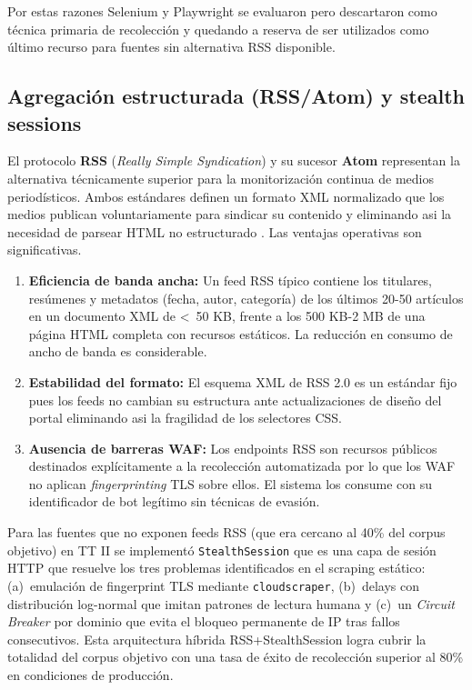 Por estas razones Selenium y Playwright se evaluaron pero descartaron como
técnica primaria de recolección y quedando a reserva de ser utilizados
como último recurso para fuentes sin alternativa RSS disponible.

\subsection{Agregación estructurada (RSS/Atom) y stealth sessions}
\label{subsec:ea_rss_stealth}

El protocolo \textbf{RSS} (\textit{Really Simple Syndication}) y su sucesor
\textbf{Atom} representan la alternativa técnicamente superior para la
monitorización continua de medios periodísticos. Ambos estándares definen
un formato XML normalizado que los medios publican voluntariamente para sindicar
su contenido y eliminando asi la necesidad de parsear HTML no estructurado
\cite{hammersley2005developing}. Las ventajas operativas son significativas.

\begin{enumerate}
    \item \textbf{Eficiencia de banda ancha:} Un feed RSS típico contiene los
          titulares, resúmenes y metadatos (fecha, autor, categoría) de los
          últimos 20-50 artículos en un documento XML de \textless~50 KB,
          frente a los 500 KB-2 MB de una página HTML completa con recursos
          estáticos. La reducción en consumo de ancho de banda es considerable.

    \item \textbf{Estabilidad del formato:} El esquema XML de RSS 2.0 es un
          estándar fijo pues los feeds no cambian su estructura ante
          actualizaciones de diseño del portal eliminando asi la fragilidad de
          los selectores CSS.

    \item \textbf{Ausencia de barreras WAF:} Los endpoints RSS son recursos
          públicos destinados explícitamente a la recolección automatizada por lo que los
          WAF no aplican \textit{fingerprinting} TLS sobre ellos. El sistema
          los consume con su identificador de bot legítimo sin técnicas de evasión.
\end{enumerate}

Para las fuentes que no exponen feeds RSS (que era cercano al 40\% del corpus
objetivo) en TT II se implementó \texttt{StealthSession} que es una capa de sesión
HTTP que resuelve los tres problemas identificados en el scraping estático:
(a)~emulación de fingerprint TLS mediante \texttt{cloudscraper},
(b)~delays con distribución log-normal que imitan patrones de lectura humana
y (c)~un \textit{Circuit Breaker} por dominio que evita el bloqueo permanente
de IP tras fallos consecutivos. Esta arquitectura híbrida RSS+StealthSession
logra cubrir la totalidad del corpus objetivo con una tasa de éxito de recolección
superior al 80\% en condiciones de producción.

